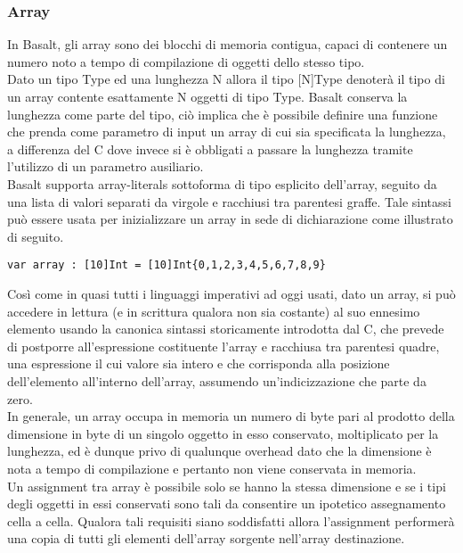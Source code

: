 \subsubsection{Array}
In Basalt, gli array sono dei blocchi di memoria contigua, capaci di contenere un numero noto a tempo di compilazione di oggetti dello stesso tipo. \\

Dato un tipo Type ed una lunghezza N allora il tipo [N]Type denoterà il tipo di un array contente esattamente  N oggetti di tipo Type. Basalt 
conserva la lunghezza come parte del tipo, ciò implica che è possibile definire una funzione che prenda come parametro di input un array di cui 
sia specificata la lunghezza, a differenza del C dove invece si è obbligati a passare la lunghezza tramite l’utilizzo di un parametro ausiliario.  \\

Basalt supporta array-literals sottoforma di tipo esplicito dell’array, seguito da una lista di valori separati 
da virgole e racchiusi tra parentesi graffe. Tale sintassi può essere usata per inizializzare un array in 
sede di dichiarazione come illustrato di seguito. \\

\vspace{0.5cm}
\begin{lstlisting}[frame=single]
var array : [10]Int = [10]Int{0,1,2,3,4,5,6,7,8,9}
\end{lstlisting}
\vspace{0.5cm}

Così come in quasi tutti i linguaggi imperativi ad oggi usati, dato un array, si può accedere in lettura (e in scrittura qualora non sia costante) 
al suo ennesimo elemento usando la canonica sintassi storicamente introdotta dal C, che prevede 
di postporre all’espressione costituente l’array e racchiusa tra parentesi quadre, una espressione il cui valore sia intero e che 
corrisponda alla posizione dell’elemento all’interno dell’array, assumendo un’indicizzazione che parte da zero. \\

In generale, un array occupa in memoria un numero di byte pari al prodotto della dimensione 
in byte di un singolo oggetto in esso conservato, moltiplicato per la lunghezza, ed è dunque privo di qualunque overhead 
dato che la dimensione è nota a tempo di compilazione e pertanto non viene conservata in memoria. \\

Un assignment tra array è possibile solo se hanno la stessa dimensione e se i tipi 
degli oggetti in essi conservati sono tali da consentire un ipotetico assegnamento cella a cella. Qualora tali 
requisiti siano soddisfatti allora l’assignment performerà una copia di tutti gli elementi dell’array sorgente nell’array destinazione.